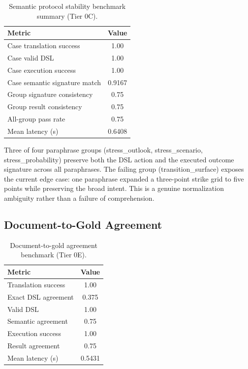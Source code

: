 \documentclass[11pt,a4paper]{article}
\begin{document}
\begin{table}[h]
\centering
\caption{Semantic protocol stability benchmark summary (Tier 0C).}
\begin{tabular}{@{}lc@{}}
\toprule
Metric & Value \\ \midrule
Case translation success & 1.00 \\
Case valid DSL & 1.00 \\
Case execution success & 1.00 \\
Case semantic signature match & 0.9167 \\
Group signature consistency & 0.75 \\
Group result consistency & 0.75 \\
All-group pass rate & 0.75 \\
Mean latency (s) & 0.6408 \\ \bottomrule
\end{tabular}
\label{tab:semantic_stability}
\end{table}

Three of four paraphrase groups (stress\_outlook, stress\_scenario, stress\_probability) preserve both the DSL action and the executed outcome signature across all paraphrases. The failing group (transition\_surface) exposes the current edge case: one paraphrase expanded a three-point strike grid to five points while preserving the broad intent. This is a genuine normalization ambiguity rather than a failure of comprehension.

\subsection{Document-to-Gold Agreement}

\begin{table}[h]
\centering
\caption{Document-to-gold agreement benchmark (Tier 0E).}
\begin{tabular}{@{}lc@{}}
\toprule
Metric & Value \\ \midrule
Translation success & 1.00 \\
Exact DSL agreement & 0.375 \\
Valid DSL & 1.00 \\
Semantic agreement & 0.75 \\
Execution success & 1.00 \\
Result agreement & 0.75 \\
Mean latency (s) & 0.5431 \\ \bottomrule
\end{tabular}
\label{tab:gold_agreement}
\end{table}
\end{document}
